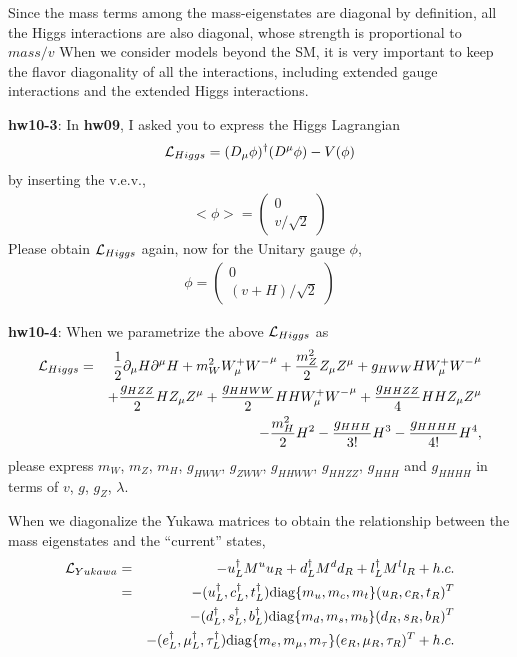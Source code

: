 \documentclass[12pt]{article}
\def\del{{\partial}}
\begin{document}
  Since the mass terms among the mass-eigenstates are diagonal by
  definition, all the Higgs interactions are also diagonal, whose
  strength is proportional to
  $mass/v$
  When we consider models beyond the SM, it is very important to keep
  the flavor diagonality of all the interactions, including extended
  gauge interactions and the extended Higgs interactions.

{\bf hw10-3}: In {\bf hw09}, I asked you to express the Higgs Lagrangian
\begin{eqnarray}
  {\cal L}_{Higgs} = (D_\mu \phi)^\dagger (D^\mu \phi) - V(\phi)
\end{eqnarray}
   by inserting the v.e.v.,
\begin{eqnarray}
  <\phi> =
  \begin{pmatrix}
    0 \\ v/\sqrt2
  \end{pmatrix}
\end{eqnarray}
  Please obtain ${\cal L}_{Higgs}$ again, now for the Unitary gauge $\phi$,
\begin{eqnarray}
  \phi = 
  \begin{pmatrix}
    0 \\ (v+H)/\sqrt2
  \end{pmatrix}
\end{eqnarray}

{\bf hw10-4}:
  When we parametrize the above ${\cal L}_{Higgs}$ as
\begin{eqnarray}
  {\cal L}_{Higgs} &=& \frac{1}{2} \del_\mu H \del^\mu H+
              m_W^2 W^+_\mu {W^-}^\mu
              + \frac{m_Z^2}{2} Z_\mu Z^\mu
              + g_{HWW} H W^+_\mu {W^-}^\mu
              \nonumber \\ &&+ \frac{g_{HZZ}}{2} H Z_\mu Z^\mu
              + \frac{g_{HHWW}}{2} HH W^+_\mu {W^-}^\mu
              + \frac{g_{HHZZ}}{4} HH Z_\mu Z^\mu
              \nonumber \\ &&- \frac{m_H^2}{2} H^2
              - \frac{g_{HHH}}{3!} H^3
              - \frac{g_{HHHH}}{4!} H^4,
\end{eqnarray}
  please express $m_W$, $m_Z$, $m_H$, $g_{HWW}$, $g_{ZWW}$, $g_{HHWW}$, $g_{HHZZ}$, $g_{HHH}$ and $g_{HHHH}$ in terms of $v$, $g$, $g_Z$, $\lambda$.

  When we diagonalize the Yukawa matrices to obtain the relationship
  between the mass eigenstates and the ``current'' states,
\begin{eqnarray}
  {\cal L}_{Yukawa} &=&
  -u_L^\dagger M^u u_R + d_L^\dagger M^d d_R + l_L^\dagger M^l l_R + h.c. \\
  &=&
  -(u_L^\dagger, c_L^\dagger, t_L^\dagger) {\rm diag}\{m_u,m_c,m_t\} (u_R,c_R,t_R)^T\nonumber \\
  &&-(d_L^\dagger, s_L^\dagger, b_L^\dagger) {\rm diag}\{m_d,m_s,m_b\} (d_R,s_R,b_R)^T \nonumber \\ &&- (e_L^\dagger, \mu_L^\dagger, \tau_L^\dagger) {\rm diag}\{m_e,m_\mu,m_\tau\} (e_R,\mu_R,\tau_R)^T
  +
  h.c. \label{eq.10Lyukdiag}
\end{eqnarray}
  
\end{document}
